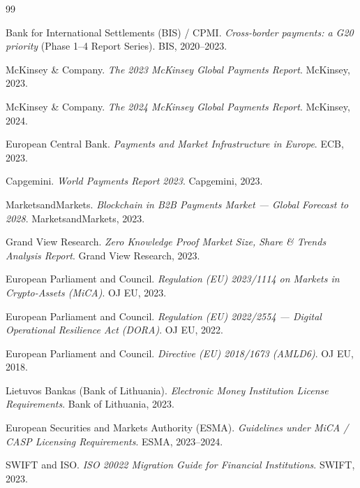 \documentclass[11pt,a4paper]{article}
\begin{document}
\newpage
\begin{thebibliography}{99}

Bank for International Settlements (BIS) / CPMI.
\textit{Cross-border payments: a G20 priority} (Phase 1--4 Report Series).
BIS, 2020--2023.

McKinsey \& Company.
\textit{The 2023 McKinsey Global Payments Report}.
McKinsey, 2023.

McKinsey \& Company.
\textit{The 2024 McKinsey Global Payments Report}.
McKinsey, 2024.

European Central Bank.
\textit{Payments and Market Infrastructure in Europe}.
ECB, 2023.

Capgemini.
\textit{World Payments Report 2023}.
Capgemini, 2023.

MarketsandMarkets.
\textit{Blockchain in B2B Payments Market --- Global Forecast to 2028}.
MarketsandMarkets, 2023.

Grand View Research.
\textit{Zero Knowledge Proof Market Size, Share \& Trends Analysis Report}.
Grand View Research, 2023.

European Parliament and Council.
\textit{Regulation (EU) 2023/1114 on Markets in Crypto-Assets (MiCA)}.
OJ EU, 2023.

European Parliament and Council.
\textit{Regulation (EU) 2022/2554 --- Digital Operational Resilience Act (DORA)}.
OJ EU, 2022.

European Parliament and Council.
\textit{Directive (EU) 2018/1673 (AMLD6)}.
OJ EU, 2018.

Lietuvos Bankas (Bank of Lithuania).
\textit{Electronic Money Institution License Requirements}.
Bank of Lithuania, 2023.

European Securities and Markets Authority (ESMA).
\textit{Guidelines under MiCA / CASP Licensing Requirements}.
ESMA, 2023--2024.

SWIFT and ISO.
\textit{ISO 20022 Migration Guide for Financial Institutions}.
SWIFT, 2023.


\end{thebibliography}
\end{document}
